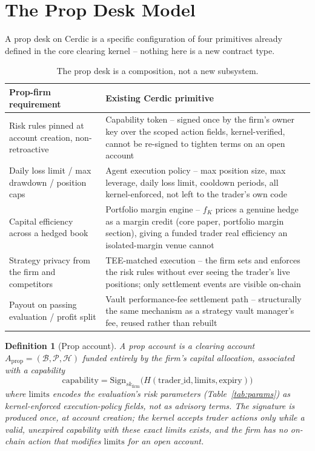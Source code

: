 \documentclass[11pt,a4paper]{article}
\newtheorem{definition}{Definition}[section]
\begin{document}
\section{The Prop Desk Model}
\label{sec:model}

A prop desk on Cerdic is a specific configuration of four primitives already defined in
the core clearing kernel -- nothing here is a new contract type.

\begin{table}[h]
  \centering
  \begin{tabular}{lp{9.2cm}}
    \toprule
    \textbf{Prop-firm requirement} & \textbf{Existing Cerdic primitive} \\
    \midrule
    Risk rules pinned at account creation, non-retroactive &
      Capability token -- signed once by the firm's owner key over the scoped action fields,
      kernel-verified, cannot be re-signed to tighten terms on an open account \\
    Daily loss limit / max drawdown / position caps &
      Agent execution policy -- max position size, max leverage, daily loss limit, cooldown
      periods, all kernel-enforced, not left to the trader's own code \\
    Capital efficiency across a hedged book &
      Portfolio margin engine -- $f_K$ prices a genuine hedge as a margin credit
      (core paper, portfolio margin section), giving a funded trader real efficiency an
      isolated-margin venue cannot \\
    Strategy privacy from the firm and competitors &
      TEE-matched execution -- the firm sets and enforces the risk rules without ever
      seeing the trader's live positions; only settlement events are visible on-chain \\
    Payout on passing evaluation / profit split &
      Vault performance-fee settlement path -- structurally the same mechanism as a
      strategy vault manager's fee, reused rather than rebuilt \\
    \bottomrule
  \end{tabular}
  \caption{The prop desk is a composition, not a new subsystem.}
  \label{tab:composition}
\end{table}

\begin{definition}[Prop account]
A prop account is a clearing account $A_{\text{prop}} = (\mathcal{B}, \mathcal{P},
\mathcal{H})$ funded entirely by the firm's capital allocation, associated with a capability
$$\text{capability} = \text{Sign}_{sk_{\text{firm}}}\big(H(\text{trader\_id}, \text{limits},
\text{expiry})\big)$$
where $\text{limits}$ encodes the evaluation's risk parameters (Table~\ref{tab:params}) as
kernel-enforced execution-policy fields, not as advisory terms. The signature is produced
once, at account creation; the kernel accepts trader actions only while a valid, unexpired
capability with these exact limits exists, and the firm has no on-chain action that
modifies $\text{limits}$ for an open account.
\end{definition}
\end{document}

